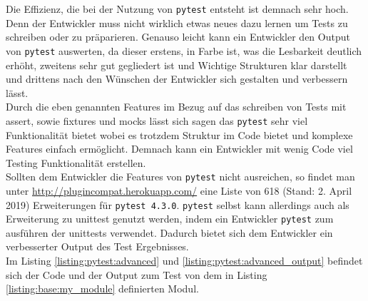 Die Effizienz, die bei der Nutzung von \lstinline{pytest} entsteht ist demnach sehr hoch. Denn der Entwickler
muss nicht wirklich etwas neues dazu lernen um Tests zu schreiben oder zu präparieren. Genauso
leicht kann ein Entwickler den Output von \lstinline{pytest} auswerten, da dieser erstens, in Farbe ist, was
die Lesbarkeit deutlich erhöht, zweitens sehr gut gegliedert ist und Wichtige Strukturen klar
darstellt und drittens nach den Wünschen der Entwickler sich gestalten und verbessern lässt.
\newline
\\
Durch die eben genannten Features im Bezug auf das schreiben von Tests mit assert, sowie
\Glspl{fixture} und \Glspl{mock} lässt sich sagen das \lstinline{pytest} sehr viel Funktionalität bietet
wobei es trotzdem Struktur im Code bietet und komplexe Features einfach ermöglicht. Demnach
kann ein Entwickler mit wenig Code viel Testing Funktionalität erstellen.
\newline
\\
Sollten dem Entwickler die Features von \lstinline{pytest} nicht ausreichen, so findet man unter
\url{http://plugincompat.herokuapp.com/} eine Liste von 618 (Stand: 2. April 2019) Erweiterungen
für \lstinline{pytest 4.3.0}. \lstinline{pytest} selbst kann allerdings auch als Erweiterung zu unittest
genutzt werden, indem ein Entwickler \lstinline{pytest} zum ausführen der unittests verwendet. Dadurch bietet
sich dem Entwickler ein verbesserter Output des Test Ergebnisses.
\newline
\\
Im Listing \ref{listing:pytest:advanced} und \ref{listing:pytest:advanced_output} befindet sich der
Code und der Output zum Test von dem in Listing \ref{listing:base:my_module} definierten Modul.